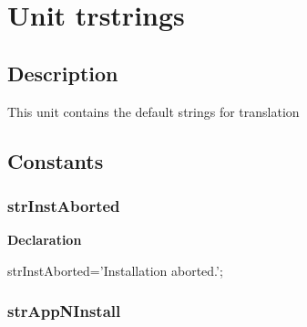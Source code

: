 \documentclass{report}
\newif\ifpdf
\begin{document}
\chapter{Unit trstrings}
\label{trstrings}
\section{Description}
This unit contains the default strings for translation
\section{Constants}
\ifpdf
\subsection*{\large{\textbf{strInstAborted}}\normalsize\hspace{1ex}\hrulefill}
\else
\subsection*{strInstAborted}
\fi
\label{trstrings-strInstAborted}
\begin{list}{}{
\setlength{\itemindent}{0cm}
\setlength{\listparindent}{0cm}
\setlength{\leftmargin}{\evensidemargin}
\addtolength{\leftmargin}{\tmplength}
\settowidth{\labelsep}{X}
\addtolength{\leftmargin}{\labelsep}
\setlength{\labelwidth}{\tmplength}
}
\item[\textbf{Declaration}\hfill]
\ifpdf
\begin{flushleft}
\fi
\begin{ttfamily}
strInstAborted='Installation aborted.';\end{ttfamily}

\ifpdf
\end{flushleft}
\fi

\end{list}
\ifpdf
\subsection*{\large{\textbf{strAppNInstall}}\normalsize\hspace{1ex}\hrulefill}
\else
\end{document}
